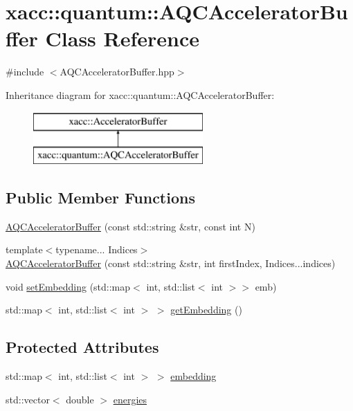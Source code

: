 \hypertarget{a00022}{}\section{xacc\+:\+:quantum\+:\+:A\+Q\+C\+Accelerator\+Buffer Class Reference}
\label{a00022}


{\ttfamily \#include $<$A\+Q\+C\+Accelerator\+Buffer.\+hpp$>$}

Inheritance diagram for xacc\+:\+:quantum\+:\+:A\+Q\+C\+Accelerator\+Buffer\+:\begin{figure}[H]
\begin{center}
\leavevmode
\includegraphics[height=2.000000cm]{a00022}
\end{center}
\end{figure}
\subsection*{Public Member Functions}
\begin{DoxyCompactItemize}
\item 
\hyperlink{a00022_ac2f9ea58140a27741b4dc8fceaa1ca5c}{A\+Q\+C\+Accelerator\+Buffer} (const std\+::string \&str, const int N)
\item 
{\footnotesize template$<$typename... Indices$>$ }\\\hyperlink{a00022_a628c742acf1d20fc8fe9b69f9be7b2c6}{A\+Q\+C\+Accelerator\+Buffer} (const std\+::string \&str, int first\+Index, Indices...\+indices)
\item 
void \hyperlink{a00022_a23992d11bdb6f093c0ce3f743677d4d9}{set\+Embedding} (std\+::map$<$ int, std\+::list$<$ int $>$$>$ emb)
\item 
std\+::map$<$ int, std\+::list$<$ int $>$ $>$ \hyperlink{a00022_ae98155c023d1b31b3b55a8c8e4ec6bc6}{get\+Embedding} ()
\end{DoxyCompactItemize}
\subsection*{Protected Attributes}
\begin{DoxyCompactItemize}
\item 
std\+::map$<$ int, std\+::list$<$ int $>$ $>$ \hyperlink{a00022_a26fd739244b0346cc3398eef31b11264}{embedding}
\item 
std\+::vector$<$ double $>$ \hyperlink{a00022_abe6d781724e197df449d8dfcde60e1a4}{energies}
\end{DoxyCompactItemize}


